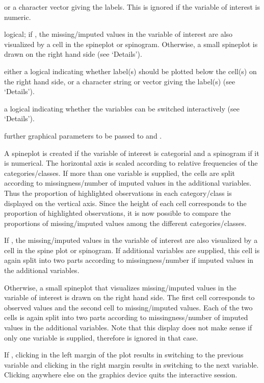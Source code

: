 \begin{Arguments}
\begin{ldescription}
or a character vector giving the labels.  This is ignored if the 
variable of interest is numeric.
\item[\code{only.miss}] logical; if , the missing/imputed values in the 
variable of interest are also visualized by a cell in the spineplot or 
spinogram.  Otherwise, a small spineplot is drawn on the right hand 
side (see `Details').
\item[\code{miss.labels}] either a logical indicating whether label(s) should 
be plotted below the cell(s) on the right hand side, or a character 
string or vector giving the label(s) (see `Details').
\item[\code{interactive}] a logical indicating whether the variables can be 
switched interactively (see `Details').
\item[\code{...}] further graphical parameters to be passed to 
 and .
\end{ldescription}
\end{Arguments}
%
\begin{Details}\relax
A spineplot is created if the variable of interest is categorial 
and a spinogram if it is numerical.  The horizontal axis is scaled 
according to relative frequencies of the categories/classes.  If 
more than one variable is supplied, the cells are split according to 
missingness/number of imputed values in the additional variables. 
Thus the proportion of highlighted observations in each category/class
is displayed on the vertical axis. Since the height of each cell 
corresponds to the proportion of highlighted observations, it is now
possible to compare the proportions of missing/imputed values among the 
different categories/classes.

If , the missing/imputed values in the variable of interest 
are also visualized by a cell in the spine plot or spinogram.  If 
additional variables are supplied, this cell is again split into two 
parts according to missingness/number if imputed values in the additional
variables.

Otherwise, a small spineplot that visualizes missing/imputed values in the 
variable of interest is drawn on the right hand side.  The first cell 
corresponds to observed values and the second cell to missing/imputed values.  
Each of the two cells is again split into two parts according to 
missingness/number of imputed values in the additional variables.
Note that this display does  not make sense if only one variable is supplied,
therefore  is ignored in that case.

If , clicking in the left margin of the plot 
results in switching to the previous variable and clicking in the right 
margin results in switching to the next variable.  Clicking anywhere 
else on the graphics device quits the interactive session.
\end{Details}
